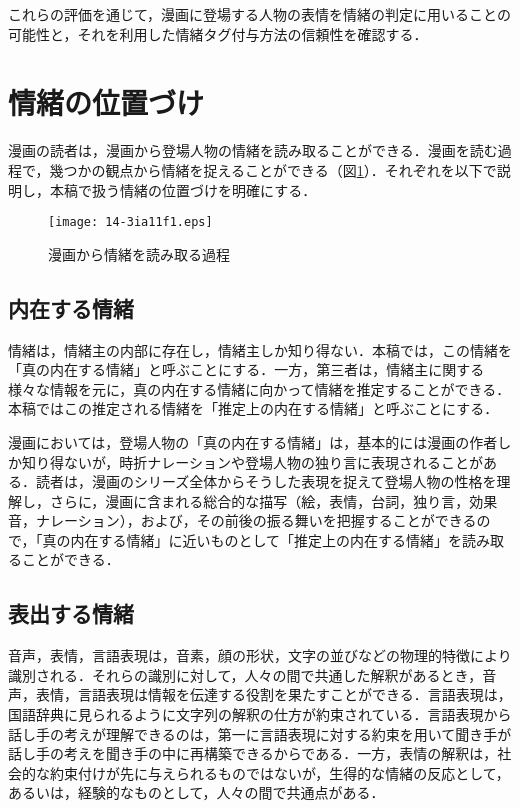 \documentclass[japanese]{jnlp_1.3c}
\begin{document}
これらの評価を通じて，漫画に登場する人物の表情を情緒の判定に用いることの可能性と，それを利用した情緒タグ付与方法の信頼性を確認する．


\section{情緒の位置づけ}

漫画の読者は，漫画から登場人物の情緒を読み取ることができる．漫画を読む過程で，幾つかの観点から情緒を捉えることができる（図\ref{fig1}）．それぞれを以下で説明し，本稿で扱う情緒の位置づけを明確にする．

\begin{figure}[b]
\begin{center}
    \texttt{[image: 14-3ia11f1.eps]}
\caption{漫画から情緒を読み取る過程} \label{fig1}
\end{center}
\end{figure}

\subsection{内在する情緒}

情緒は，情緒主の内部に存在し，情緒主しか知り得ない．本稿では，この情緒を「真の内在する情緒」と呼ぶことにする．一方，第三者は，情緒主に関する様々な情報を元に，真の内在する情緒に向かって情緒を推定することができる．本稿ではこの推定される情緒を「推定上の内在する情緒」と呼ぶことにする．

漫画においては，登場人物の「真の内在する情緒」は，基本的には漫画の作者しか知り得ないが，時折ナレーションや登場人物の独り言に表現されることがある．読者は，漫画のシリーズ全体からそうした表現を捉えて登場人物の性格を理解し，さらに，漫画に含まれる総合的な描写（絵，表情，台詞，独り言，効果音，ナレーション），および，その前後の振る舞いを把握することができるので，「真の内在する情緒」に近いものとして「推定上の内在する情緒」を読み取ることができる．

\subsection{表出する情緒}

音声，表情，言語表現は，音素，顔の形状，文字の並びなどの物理的特徴により識別される．それらの識別に対して，人々の間で共通した解釈があるとき，音声，表情，言語表現は情報を伝達する役割を果たすことができる．言語表現は，国語辞典に見られるように文字列の解釈の仕方が約束されている．言語表現から話し手の考えが理解できるのは，第一に言語表現に対する約束を用いて聞き手が話し手の考えを聞き手の中に再構築できるからである．一方，表情の解釈は，社会的な約束付けが先に与えられるものではないが，生得的な情緒の反応として，あるいは，経験的なものとして，人々の間で共通点がある．
\end{document}
